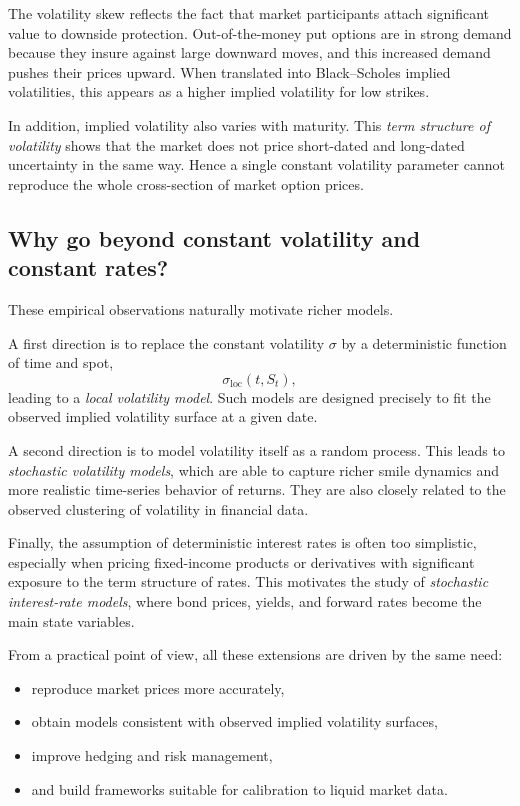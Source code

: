 \documentclass[11pt]{article}
\theoremstyle{plain}
\theoremstyle{definition}
\theoremstyle{remark}
\begin{document}
The volatility skew reflects the fact that market participants attach
significant value to downside protection.
Out-of-the-money put options are in strong demand because they insure
against large downward moves, and this increased demand pushes their
prices upward.
When translated into Black--Scholes implied volatilities, this appears
as a higher implied volatility for low strikes. 

In addition, implied volatility also varies with maturity.
This \emph{term structure of volatility} shows that the market does not
price short-dated and long-dated uncertainty in the same way.
Hence a single constant volatility parameter cannot reproduce the whole
cross-section of market option prices. 

\subsection{Why go beyond constant volatility and constant rates?}

These empirical observations naturally motivate richer models.

A first direction is to replace the constant volatility \(\sigma\) by a
deterministic function of time and spot,
\[
\sigma_{\mathrm{loc}}(t,S_t),
\]
leading to a \emph{local volatility model}.
Such models are designed precisely to fit the observed implied volatility
surface at a given date. 

A second direction is to model volatility itself as a random process.
This leads to \emph{stochastic volatility models}, which are able to
capture richer smile dynamics and more realistic time-series behavior of
returns.
They are also closely related to the observed clustering of volatility
in financial data. 

Finally, the assumption of deterministic interest rates is often too
simplistic, especially when pricing fixed-income products or derivatives
with significant exposure to the term structure of rates.
This motivates the study of \emph{stochastic interest-rate models},
where bond prices, yields, and forward rates become the main state
variables.

From a practical point of view, all these extensions are driven by the
same need:
\begin{itemize}[leftmargin=1.4em]
    \item reproduce market prices more accurately,
    \item obtain models consistent with observed implied volatility surfaces,
    \item improve hedging and risk management,
    \item and build frameworks suitable for calibration to liquid market data.  
\end{itemize}
\end{document}
